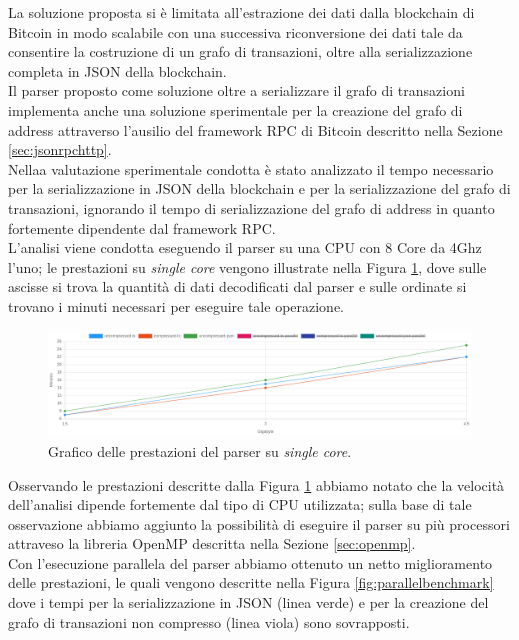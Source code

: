 La soluzione proposta si è limitata all'estrazione dei dati dalla blockchain di Bitcoin in modo scalabile con una successiva riconversione dei dati tale da consentire la costruzione di un grafo di transazioni, oltre alla serializzazione completa in JSON della blockchain.\\
Il parser proposto come soluzione oltre a serializzare il grafo di transazioni implementa anche una soluzione sperimentale per la creazione del grafo di address attraverso l'ausilio del framework RPC di Bitcoin descritto nella Sezione \ref{sec:jsonrpchttp}.\\
Nellaa valutazione sperimentale condotta è stato analizzato il tempo necessario   per la serializzazione in JSON della blockchain e per la serializzazione del grafo di transazioni, ignorando il tempo di serializzazione del grafo di address in quanto fortemente dipendente dal framework RPC.\\
L'analisi viene condotta eseguendo il parser su una CPU  con 8 Core da 4Ghz l'uno; le prestazioni su \emph{single core} vengono illustrate nella Figura \ref{fig:noparallelbenchmark}, dove sulle ascisse si trova la quantità di dati decodificati dal parser e sulle ordinate si trovano  i minuti necessari per eseguire tale operazione.
\begin{figure}[H]
\centering
 \includegraphics[scale=0.2]{images/demo/no_paralel_benckmark.png}
 \caption{Grafico delle prestazioni del parser su \emph{single core}.}\label{fig:noparallelbenchmark}
\end{figure}

Osservando le prestazioni descritte dalla Figura \ref{fig:noparallelbenchmark} abbiamo notato che la velocità dell'analisi dipende fortemente dal tipo di CPU utilizzata; sulla base di tale  osservazione abbiamo aggiunto la possibilità di eseguire il parser su più processori attraveso la libreria OpenMP descritta nella Sezione \ref{sec:openmp}.\\
Con l'esecuzione parallela del parser abbiamo ottenuto un netto miglioramento delle prestazioni, le quali vengono descritte nella Figura \ref{fig:parallelbenchmark} dove i tempi  per la serializzazione in JSON (linea verde) e per la creazione del grafo di transazioni non compresso (linea viola) sono sovrapposti.\\


